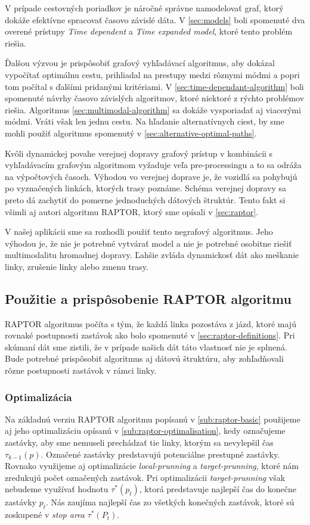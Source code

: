 V prípade cestovných poriadkov je náročné správne namodelovať graf, ktorý dokáže efektívne spracovať časovo závislé dáta. V \ref{sec:models} boli spomenuté dva overené prístupy \textit{Time dependent} a \textit{Time expanded model}, ktoré tento problém riešia. 

Ďalšou výzvou je prispôsobiť grafový vyhľadávací algoritmus, aby dokázal vypočítať optimálnu cestu, prihliadal na prestupy medzi rôznymi módmi a popri tom počítal s ďalšími pridanými kritériami.
V \ref{sec:time-dependant-algorithm} boli spomenuté návrhy časovo závislých algoritmov, ktoré niektoré z rýchto problémov riešia. Algoritmus \ref{sec:multimodal-algorithm} sa dokáže vysporiadať aj viacerými módmi. Vráti však len jednu cestu. Na hľadanie alternatívnych ciest, by sme mohli použiť algoritmus spomenutý v \ref{sec:alternative-optimal-paths}.

Kvôli dynamickej povahe verejnej dopravy grafový prístup v kombinácii s vyhľadávacím grafovým algoritmom vyžaduje veľa pre-processingu a to sa odráža na výpočtových časoch. Výhodou vo verejnej doprave je, že vozidlá sa pohybujú po vyznačených linkách, ktorých trasy poznáme. Schéma verejnej dopravy sa preto dá zachytiť do pomerne jednoduchých dátových štruktúr. Tento fakt si všimli aj autori algoritmu RAPTOR, ktorý sme opísali v \ref{sec:raptor}. 

V našej aplikácii sme sa rozhodli použiť tento negrafový algoritmus. Jeho výhodou je, že nie je potrebné vytvárať model a nie je potrebné osobitne riešiť multimodalitu hromadnej dopravy. Ľahšie zvláda dynamickosť dát ako meškanie linky, zrušenie linky alebo zmenu trasy. 

\subsection{Použitie a prispôsobenie RAPTOR algoritmu}
RAPTOR algoritmus počíta s tým, že každá linka pozostáva z jázd, ktoré majú rovnaké postupnosti zastávok ako bolo spomenuté v \ref{sec:raptor-definitions}. Pri skúmaní dát sme zistili, že v prípade našich dát táto vlastnosť nie je splnená. Bude potrebné prispôsobiť algoritmus aj dátovú štruktúru, aby zohľadňovali rôzne postupnosti zastávok v rámci linky.

\subsubsection{Optimalizácia}
Na základnú verziu RAPTOR algoritmu popísanú v \ref{sub:raptor-basic} použijeme aj jeho optimalizáciu opísanú v \ref{sub:raptor-optimalisation}, kedy označujeme zastávky, aby sme nemuseli prechádzať tie linky, ktorým sa nevylepšil čas $\tau_{k-1}(p)$. Označené zastávky predstavujú potenciálne prestupné zastávky.  Rovnako využijeme aj optimalizácie \textit{local-prunning} a \textit{target-prunning}, ktoré nám zredukujú počet označených zastávok. Pri optimalizácii \textit{target-prunning} však nebudeme využívať hodnotu $\tau^*(p_t)$, ktorá predstavuje najlepší čas do konečne zastávky $p_t$. Nás zaujíma najlepší čas zo všetkých konečných zastávok, ktoré sú zoskupené v \textit{stop area} $\tau^*(P_t)$. 

